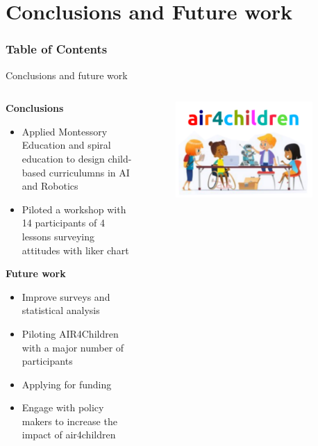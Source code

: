 \section{Conclusions and Future work}


\begin{frame}
      \frametitle{Table of Contents}
      \tableofcontents[currentsection]
\end{frame}



{
\begin{frame}{Conclusions and future work}

  \begin{columns}
  \begin{column}{.75\linewidth}

  \textbf{Conclusions}   

  \begin{itemize}
    \item Applied Montessory Education and spiral education to design child-based curriculumns in AI and Robotics
    \item Piloted a workshop with 14 participants of 4 lessons surveying attitudes with liker chart
  \end{itemize}

  \textbf{Future work}
  \begin{itemize}
    \item Improve surveys and statistical analysis
    \item Piloting AIR4Children with a major number of participants 
    \item Applying for funding 
    \item Engage with policy makers to increase the impact of air4children
\end{itemize}

    \end{column}


  \begin{column}{.3\linewidth}

      \begin{figure}
        \centering
        \includegraphics[width=0.9\textwidth]{./figures/logo/outputs/drawing-v00.png}
      \end{figure}


\end{column}
\end{columns}
\end{frame}}

